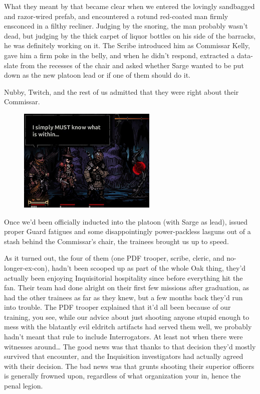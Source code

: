 What they meant by that became clear when we entered the lovingly sandbagged and razor-wired prefab, and encountered a rotund red-coated man firmly ensconced in a filthy recliner. 
Judging by the snoring, the man probably wasn't dead, but judging by the thick carpet of liquor bottles on his side of the barracks, he was definitely working on it. 
The Scribe introduced him as Commissar Kelly, gave him a firm poke in the belly, and when he didn't respond, extracted a data-slate from the recesses of the chair and asked whether Sarge wanted to be put down as the new platoon lead or if one of them should do it. 


Nubby, Twitch, and the rest of us admitted that they were right about their Commissar.

\begin{figure}
	\begin{center}
		\includegraphics[width=\figwidth]{pics/21/13.png}
	\end{center}
\end{figure}
Once we'd been officially inducted into the platoon (with Sarge as lead), issued proper Guard fatigues and some disappointingly power-packless lasguns out of a stash behind the Commissar's chair, the trainees brought us up to speed.

As it turned out, the four of them (one PDF trooper,  scribe, cleric, and no-longer-ex-con), hadn't been scooped up as part of the whole Oak thing, they'd actually been enjoying Inquisitorial hospitality since before everything hit the fan. 
Their team had done alright on their first few missions after graduation, as had the other trainees as far as they knew, but a few months back they'd run into trouble. 
The PDF trooper explained that it'd all been because of our training, you see, while our advice about just shooting anyone stupid enough to mess with the blatantly evil eldritch artifacts had served them well, we probably hadn't meant that rule to include Interrogators. 
At least not when there were witnesses around… The good news was that thanks to that decision they'd mostly survived that encounter, and the Inquisition investigators had actually agreed with their decision. 
The bad news was that grunts shooting their superior officers is generally frowned upon, regardless of what organization your in, hence the penal legion.

